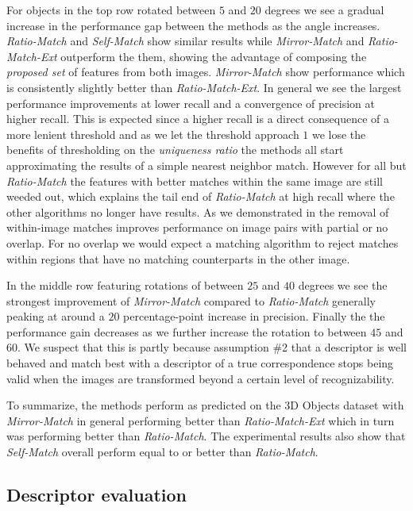\documentclass[journal]{IEEEtran}
\begin{document}
For objects in the top row rotated between $5$ and $20$ degrees we see a 
gradual increase in the performance gap between the methods as the angle 
increases.  \emph{Ratio-Match} and \emph{Self-Match} show similar 
results while \emph{Mirror-Match} and \emph{Ratio-Match-Ext} outperform 
the them, showing the advantage of composing the \emph{proposed set} of 
features from both images. \emph{Mirror-Match} show performance which is 
consistently slightly better than \emph{Ratio-Match-Ext}. In general we 
see the largest performance improvements at lower recall and a 
convergence of precision at higher recall. This is expected since a 
higher recall is a direct consequence of a more lenient threshold and as
we let the threshold approach $1$ we lose the benefits of thresholding 
on the \emph{uniqueness ratio} the methods all start approximating the 
results of a simple nearest neighbor match. However for all but 
\emph{Ratio-Match} the features with better matches within the same 
image are still weeded out, which explains the tail end of 
\emph{Ratio-Match} at high recall where the other algorithms no longer 
have results. As we demonstrated in \cite{arnfred2013mirror} the removal 
of within-image matches improves performance on image pairs with partial 
or no overlap. For no overlap we would expect a matching algorithm to 
reject matches within regions that have no matching counterparts in the 
other image.

In the middle row featuring rotations of between $25$ and $40$ degrees 
we see the strongest improvement of \emph{Mirror-Match} compared to 
\emph{Ratio-Match} generally peaking at around
a $20$ percentage-point increase in precision. Finally the the performance
gain decreases as we further increase the rotation to between $45$ and 
$60$. We suspect that this is partly because assumption \#2 that a 
descriptor is well behaved and match best with a descriptor of a true 
correspondence stops being valid when the images are transformed beyond 
a certain level of recognizability.

To summarize, the methods perform as predicted on the 3D Objects dataset
with \emph{Mirror-Match} in general performing better than 
\emph{Ratio-Match-Ext} which in turn was performing better than 
\emph{Ratio-Match}. The experimental results also show that 
\emph{Self-Match} overall perform equal to or better than 
\emph{Ratio-Match}.

\subsection{Descriptor evaluation}
\label{label:desc}
\end{document}
